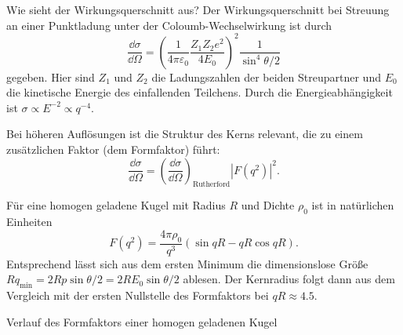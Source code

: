 \begin{fquestion}{Wie sieht der Wirkungsquerschnitt aus?}
    Der Wirkungsquerschnitt bei Streuung an einer Punktladung unter der Coloumb-Wechselwirkung ist durch 
    $$\frac{\dd \sigma}{\dd \Omega} = \left( \frac{1}{4 \pi \varepsilon_0} \frac{Z_1 Z_2 e^2}{4 E_0}\right)^2 \frac{1}{\sin^4 \theta/2}$$
    gegeben. Hier sind $Z_1$ und $Z_2$ die Ladungszahlen der beiden Streupartner und $E_0$ die kinetische Energie des einfallenden Teilchens.
    Durch die Energieabhängigkeit ist $\sigma \propto E^{-2} \propto q^{-4}$.
    
    Bei höheren Auflösungen ist die Struktur des Kerns relevant, die zu einem zusätzlichen Faktor (dem Formfaktor) führt:
    $$\frac{\dd \sigma}{\dd \Omega}  = \left(\frac{\dd \sigma}{\dd \Omega} \right)_{\mathrm{Rutherford}} |F(q^2)|^2.$$
    
    Für eine homogen geladene Kugel mit Radius $R$ und Dichte $\rho_0$ ist in natürlichen Einheiten
    $$F(q^2) = \frac{4\pi \rho_0}{q^3} (\sin q R - q R \cos q R).$$
    Entsprechend lässt sich aus dem ersten Minimum die dimensionslose Größe $R q_{\mathrm{min}} = 2 R p \sin \theta/2 = 2 R E_0 \sin \theta/2$ ablesen. 
    Der Kernradius folgt dann aus dem Vergleich mit der ersten Nullstelle des Formfaktors bei $q R \approx 4.5$.

    \begin{center}
        Verlauf des Formfaktors einer homogen geladenen Kugel
        
    \end{center}    
\end{fquestion}

